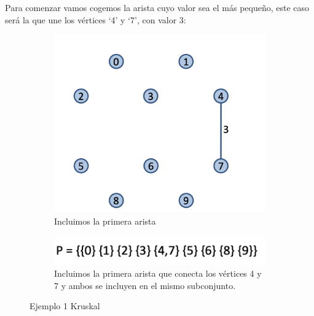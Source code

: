 Para comenzar vamos cogemos la arista cuyo valor sea el más pequeño, este caso será la que une los vértices `4' y `7', con valor 3:
\begin{figure}[h]
  \begin{minipage}{0.4\textwidth}
    \centering
    \begin{subfigure}{\textwidth}
      \centering
      \includegraphics[width=.65\textwidth]{assets/kru2.png}
      \caption{Incluimos la primera arista}
    \end{subfigure}
  \end{minipage}
  \hfill
  \begin{minipage}{0.5\textwidth}
    \centering
    \begin{subfigure}{\textwidth}
      \centering
      \includegraphics[width=\textwidth]{assets/kru3.png}
      \caption{Incluimos la primera arista que conecta los vértices 4 y 7 y ambos se incluyen en el mismo subconjunto.}
    \end{subfigure}
  \end{minipage}
  \caption{Ejemplo 1 Kruskal}
\end{figure}

